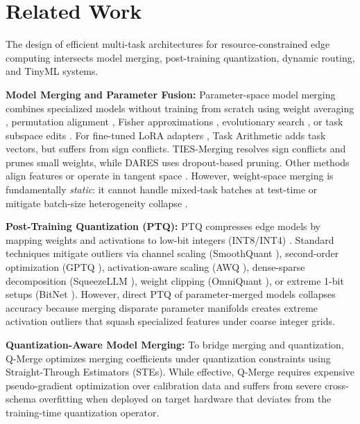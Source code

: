 \section{Related Work}
\label{sec:related_work}

The design of efficient multi-task architectures for resource-constrained edge computing intersects model merging, post-training quantization, dynamic routing, and TinyML systems.

\textbf{Model Merging and Parameter Fusion:} Parameter-space model merging combines specialized models without training from scratch using weight averaging \cite{weight_averaging}, permutation alignment \cite{git_rebasin}, Fisher approximations \cite{fisher_merging}, evolutionary search \cite{evolutionary_merging}, or task subspace edits \cite{concrete_subspaces}. For fine-tuned LoRA adapters \cite{lora}, Task Arithmetic \cite{task_arithmetic} adds task vectors, but suffers from sign conflicts. TIES-Merging \cite{ties_merging} resolves sign conflicts and prunes small weights, while DARES \cite{dares} uses dropout-based pruning. Other methods align features \cite{zipit} or operate in tangent space \cite{tangent_arithmetic}. However, weight-space merging is fundamentally \emph{static}: it cannot handle mixed-task batches at test-time or mitigate batch-size heterogeneity collapse \cite{regcalmerge}.

\textbf{Post-Training Quantization (PTQ):} PTQ compresses edge models by mapping weights and activations to low-bit integers (INT8/INT4) \cite{jacob2018integer, gholami2021survey}. Standard techniques mitigate outliers via channel scaling (SmoothQuant \cite{smoothquant}), second-order optimization (GPTQ \cite{gptq}), activation-aware scaling (AWQ \cite{awq}), dense-sparse decomposition (SqueezeLLM \cite{squeezellm}), weight clipping (OmniQuant \cite{omniquant}), or extreme 1-bit setups (BitNet \cite{bitnet}). However, direct PTQ of parameter-merged models collapses accuracy because merging disparate parameter manifolds creates extreme activation outliers that squash specialized features under coarse integer grids.

\textbf{Quantization-Aware Model Merging:} To bridge merging and quantization, Q-Merge \cite{qmerge} optimizes merging coefficients under quantization constraints using Straight-Through Estimators (STEs). While effective, Q-Merge requires expensive pseudo-gradient optimization over calibration data and suffers from severe cross-schema overfitting when deployed on target hardware that deviates from the training-time quantization operator.

